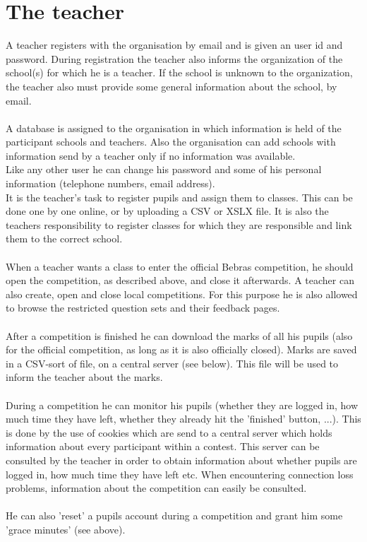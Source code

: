 \section{The teacher}

A teacher registers with the organisation by email and is given an user id and password. During
registration the teacher also informs the organization of the school(s) for which he is a teacher. If the school is unknown to the organization, the teacher also must provide some general information about the school, by email. \\
\\
A database is assigned to the organisation in which information is held of the participant schools and teachers. Also the organisation can add schools with information send by a teacher only if no information was available. \\
Like any other user he can change his password and some of his personal information (telephone numbers, email address).\\
It is the teacher's task to register pupils and assign them to classes. This can be done one by one online, or by uploading a CSV or XSLX file. It is also the teachers responsibility to register classes for which they are responsible and link them to the correct school.\\
\\
When a teacher wants a class to enter the official Bebras competition, he should open the competition, as described above, and close it afterwards. A teacher can also create, open and close local competitions. For this purpose he is also allowed to browse the restricted question sets and their feedback pages.\\
\\
After a competition is finished he can download the marks of all his pupils (also for the official competition, as long as it is also officially closed). Marks are saved in a CSV-sort of file, on a central server (see below). This file will be used to inform the teacher about the marks.\\
\\
During a competition he can monitor his pupils (whether they are logged in, how much time they have left, whether they already hit the 'finished' button, ...). This is done by the use of cookies which are send to a central server which holds information about every participant within a contest. This server can be consulted by the teacher in order to obtain information about whether pupils are logged in, how much time they have left etc. When encountering connection loss problems, information about the competition can easily be consulted.  \\
\\
He can also 'reset' a pupils account during a competition and grant him some 'grace minutes' (see above).